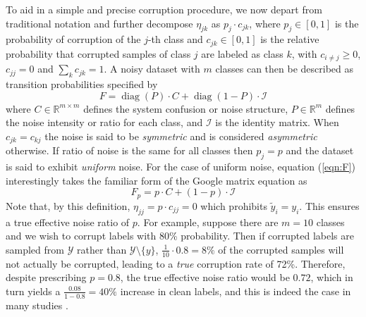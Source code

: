 \documentclass{article}
\newcommand{\R}{\mathbb{R}}
\DeclareMathOperator{\diag}{diag}
\renewcommand{\R}{\mathbb{R}}
\begin{document}
To aid in a simple and precise corruption procedure, we now depart from traditional notation and further decompose $\eta_{jk}$ as $p_j \cdot c_{jk}$, where $p_j \in [0,1]$ is the probability of corruption of the $j$-th class and $c_{jk} \in [0,1]$ is the relative probability that corrupted samples of class $j$ are labeled as class $k$, with $c_{i\neq j}\geq 0$, $c_{jj} = 0$ and $\sum_{k}{c_{jk}} = 1$.  A noisy dataset with $m$ classes can then be described as transition probabilities specified by
\begin{equation}
\label{eqn:F}
F = \diag(P) \cdot C + \diag(1-P) \cdot \mathcal{I}
\end{equation}
where $C \in \R^{m \times m}$ defines the system confusion or noise structure, $P \in \R^m$ defines the noise intensity or ratio for each class, and $\mathcal{I}$ is the identity matrix.  When $c_{jk} = c_{kj}$ the noise is said to be \emph{symmetric} and is considered \emph{asymmetric} otherwise. If ratio of noise is the same for all classes then $p_j = p$ and the dataset is said to exhibit \emph{uniform} noise.  For the case of uniform noise, equation (\ref{eqn:F}) interestingly takes the familiar form of the Google matrix equation \cite{RevModPhys.87.1261} as
\begin{equation}
\label{eqn:Fu}
F_p = p \cdot C + (1-p) \cdot \mathcal{I}
\end{equation}
Note that, by this definition, $\eta_{jj} = p \cdot c_{jj} = 0$ which prohibits $\tilde{y}_i = y_i$.  This ensures a true effective noise ratio of $p$.  For example, suppose there are $m=10$ classes and we wish to corrupt labels with 80\% probability. Then if corrupted labels are sampled from $\mathcal{Y}$ rather than $\mathcal{Y} \setminus \{y\}$, $\frac{1}{10} \cdot 0.8 = 8\%$ of the corrupted samples will not actually be corrupted, leading to a \emph{true} corruption rate of 72\%.  Therefore, despite prescribing $p=0.8$, the true effective noise ratio would be $0.72$, which in turn yields a $\frac{0.08}{1 - 0.8} = 40\%$ increase in clean labels, and this is indeed the case in many studies \cite{zhang2018,nguyen2020,li2020, zhang2020}.
\end{document}
